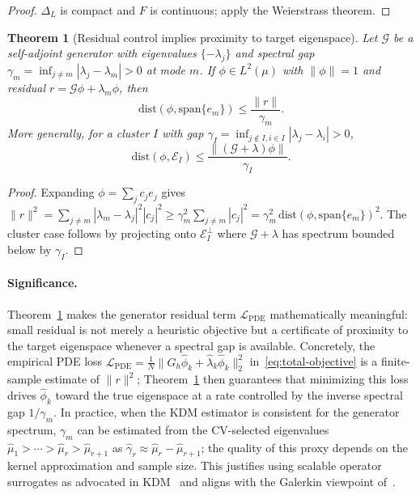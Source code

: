 \documentclass[11pt]{article}
\newtheorem{theorem}{Theorem}
\theoremstyle{remark}
\begin{document}
\begin{proof}
$\Delta_L$ is compact and $F$ is continuous; apply the Weierstrass theorem.
\end{proof}

\begin{theorem}[Residual control implies proximity to target eigenspace]
\label{thm:residual-gap}
Let $\mathcal{G}$ be a self-adjoint generator with eigenvalues $\{-\lambda_j\}$ and spectral gap $\gamma_m=\inf_{j\ne m}|\lambda_j-\lambda_m|>0$ at mode $m$.
If $\phi\in L^2(\mu)$ with $\|\phi\|=1$ and residual $r=\mathcal{G}\phi+\lambda_m\phi$, then
\[
\mathrm{dist}(\phi,\mathrm{span}\{e_m\}) \le \frac{\|r\|}{\gamma_m}.
\]
More generally, for a cluster $I$ with gap $\gamma_I=\inf_{j\notin I,i\in I}|\lambda_j-\lambda_i|>0$,
\[
\mathrm{dist}(\phi,\mathcal{E}_I) \le \frac{\|(\mathcal{G}+\lambda)\phi\|}{\gamma_I}.
\]
\end{theorem}

\begin{proof}
Expanding $\phi=\sum_j c_j e_j$ gives $\|r\|^2=\sum_{j\ne m}|\lambda_m-\lambda_j|^2|c_j|^2\ge\gamma_m^2\sum_{j\ne m}|c_j|^2=\gamma_m^2\,\mathrm{dist}(\phi,\mathrm{span}\{e_m\})^2$.
The cluster case follows by projecting onto $\mathcal{E}_I^\perp$ where $\mathcal{G}+\lambda$ has spectrum bounded below by $\gamma_I$.
\end{proof}

\paragraph{Significance.}
Theorem~\ref{thm:residual-gap} makes the generator residual term $\mathcal{L}_{\mathrm{PDE}}$ mathematically meaningful: small residual is not merely a heuristic objective but a certificate of proximity to the target eigenspace whenever a spectral gap is available.
Concretely, the empirical PDE loss $\mathcal{L}_{\mathrm{PDE}}=\frac{1}{N}\|G_h\hat\phi_k+\hat\lambda_k\hat\phi_k\|_2^2$ in~\eqref{eq:total-objective} is a finite-sample estimate of $\|r\|^2$; Theorem~\ref{thm:residual-gap} then guarantees that minimizing this loss drives $\hat\phi_k$ toward the true eigenspace at a rate controlled by the inverse spectral gap $1/\gamma_m$.
In practice, when the KDM estimator is consistent for the generator spectrum, $\gamma_m$ can be estimated from the CV-selected eigenvalues $\hat\mu_1>\cdots>\hat\mu_r>\hat\mu_{r+1}$ as $\hat\gamma_r\approx\hat\mu_r-\hat\mu_{r+1}$; the quality of this proxy depends on the kernel approximation and sample size.
This justifies using scalable operator surrogates as advocated in KDM~\citep{pmlr-v195-pillaud-vivien23a} and aligns with the Galerkin viewpoint of~\citet{pmlr-v238-cabannes24a}.
\end{document}

